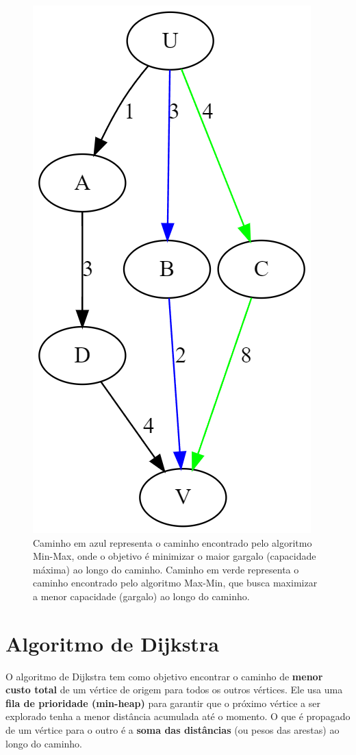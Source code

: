 \documentclass[12pt]{article}
\begin{document}
\begin{figure}[h] %
    \centering
    \includegraphics[width=.7\textwidth]{caminhos.png}
    \caption{Caminho em azul representa o caminho encontrado pelo algoritmo Min-Max, onde o objetivo é minimizar o maior gargalo (capacidade máxima) ao longo do caminho. Caminho em verde representa o caminho encontrado pelo algoritmo Max-Min, que busca maximizar a menor capacidade (gargalo) ao longo do caminho.}
    \label{fig:123}
\end{figure}

\newpage

\section{Algoritmo de Dijkstra}

O algoritmo de Dijkstra tem como objetivo encontrar o caminho de \textbf{menor custo total} de um vértice de origem para todos os outros vértices. Ele usa uma \textbf{fila de prioridade (min-heap)} para garantir que o próximo vértice a ser explorado tenha a menor distância acumulada até o momento. O que é propagado de um vértice para o outro é a \textbf{soma das distâncias} (ou pesos das arestas) ao longo do caminho.
\end{document}
